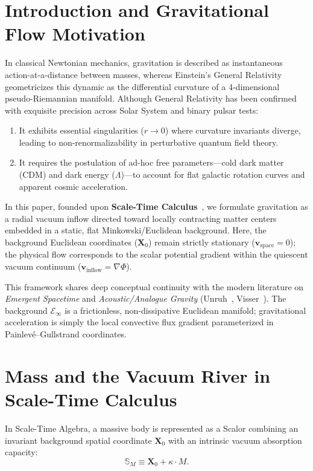 \documentclass[11pt,a4paper]{article}
\begin{document}
\section{Introduction and Gravitational Flow Motivation}
\label{sec:giris}

In classical Newtonian mechanics, gravitation is described as instantaneous action-at-a-distance between masses, whereas Einstein's General Relativity geometricizes this dynamic as the differential curvature of a 4-dimensional pseudo-Riemannian manifold. Although General Relativity has been confirmed with exquisite precision across Solar System and binary pulsar tests:
\begin{enumerate}
    \item It exhibits essential singularities ($r \to 0$) where curvature invariants diverge, leading to non-renormalizability in perturbative quantum field theory.
    \item It requires the postulation of ad-hoc free parameters—cold dark matter (CDM) and dark energy ($\Lambda$)—to account for flat galactic rotation curves and apparent cosmic acceleration.
\end{enumerate}

In this paper, founded upon \textbf{Scale-Time Calculus}~\cite{scale_calculus}, we formulate gravitation as a radial vacuum inflow directed toward locally contracting matter centers embedded in a static, flat Minkowski/Euclidean background. Here, the background Euclidean coordinates ($\mathbf{X}_0$) remain strictly stationary ($\mathbf{v}_{\mathrm{space}} = 0$); the physical flow corresponds to the scalar potential gradient within the quiescent vacuum continuum ($\mathbf{v}_{\mathrm{inflow}} = \nabla \Phi$).

This framework shares deep conceptual continuity with the modern literature on \textit{Emergent Spacetime} and \textit{Acoustic/Analogue Gravity} (Unruh~\cite{unruh1981}, Visser~\cite{visser1998}). The background $\mathcal{E}_\infty$ is a frictionless, non-dissipative Euclidean manifold; gravitational acceleration is simply the local convective flux gradient parameterized in Painlev\'e--Gullstrand coordinates.

\section{Mass and the Vacuum River in Scale-Time Calculus}
\label{sec:nehir_modeli}

In Scale-Time Algebra, a massive body is represented as a Scalor combining an invariant background spatial coordinate $\mathbf{X}_0$ with an intrinsic vacuum absorption capacity:
\begin{equation}
    \mathbb{S}_M \equiv \mathbf{X}_0 + \kappa \cdot M.
    \label{eq:skalor_kutle}
\end{equation}
\end{document}
